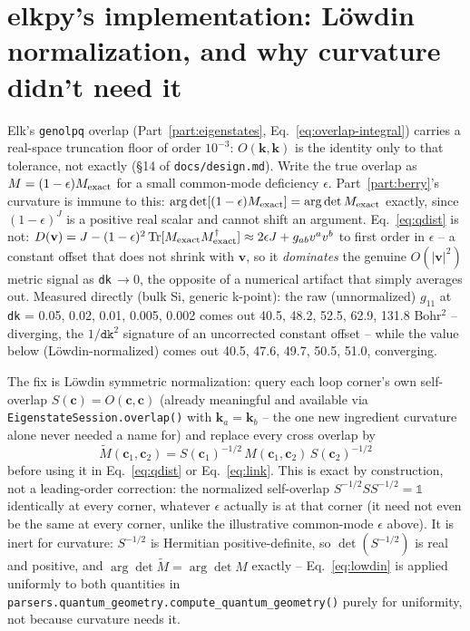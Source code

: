 \documentclass[11pt]{article}
\begin{document}
\section{elkpy's implementation: Löwdin normalization, and why curvature didn't need it}

Elk's \texttt{genolpq} overlap (Part~\ref{part:eigenstates}, Eq.~\eqref{eq:overlap-integral})
carries a real-space truncation floor of order $10^{-3}$: $O(\mathbf k,\mathbf k)$ is the
identity only to that tolerance, not exactly (\S14 of \texttt{docs/design.md}). Write the
true overlap as $M = (1-\epsilon)M_{\rm exact}$ for a small common-mode deficiency
$\epsilon$. Part~\ref{part:berry}'s curvature is immune to this: $\arg\det[(1-\epsilon)
M_{\rm exact}] = \arg\det M_{\rm exact}$ exactly, since $(1-\epsilon)^{J}$ is a positive
real scalar and cannot shift an argument. Eq.~\eqref{eq:qdist} is not: $D(\mathbf v) =
J - (1-\epsilon)^2\,\mathrm{Tr}[M_{\rm exact}M_{\rm exact}^\dagger] \approx 2\epsilon J +
g_{ab}v^av^b$ to first order in $\epsilon$ -- a constant offset that does not shrink with
$\mathbf v$, so it \emph{dominates} the genuine $O(|\mathbf v|^2)$ metric signal as
\texttt{dk}$\,\to 0$, the opposite of a numerical artifact that simply averages out.
Measured directly (bulk Si, generic k-point): the raw (unnormalized) $g_{11}$ at
\texttt{dk} = 0.05, 0.02, 0.01, 0.005, 0.002 comes out 40.5, 48.2, 52.5, 62.9, 131.8 Bohr$^2$
-- diverging, the $1/\texttt{dk}^2$ signature of an uncorrected constant offset -- while
the value below (Löwdin-normalized) comes out 40.5, 47.6, 49.7, 50.5, 51.0, converging.

The fix is Löwdin symmetric normalization: query each loop corner's own self-overlap
$S(\mathbf c) = O(\mathbf c,\mathbf c)$ (already meaningful and available via
\texttt{EigenstateSession.overlap()} with $\mathbf k_a=\mathbf k_b$ -- the one new
ingredient curvature alone never needed a name for) and replace every cross overlap by
\begin{equation}
  \tilde M(\mathbf c_1,\mathbf c_2) = S(\mathbf c_1)^{-1/2}\, M(\mathbf c_1,\mathbf c_2)\,
    S(\mathbf c_2)^{-1/2}
  \label{eq:lowdin}
\end{equation}
before using it in Eq.~\eqref{eq:qdist} or Eq.~\eqref{eq:link}. This is exact by
construction, not a leading-order correction: the normalized self-overlap
$S^{-1/2}SS^{-1/2}=\mathbb 1$ identically at every corner, whatever $\epsilon$ actually
is at that corner (it need not even be the same at every corner, unlike the illustrative
common-mode $\epsilon$ above). It is inert for curvature: $S^{-1/2}$ is Hermitian
positive-definite, so $\det(S^{-1/2})$ is real and positive, and
$\arg\det\tilde M = \arg\det M$ exactly -- Eq.~\eqref{eq:lowdin} is applied uniformly to
both quantities in \texttt{parsers.quantum\_geometry.compute\_quantum\_geometry()}
purely for uniformity, not because curvature needs it.
\end{document}
